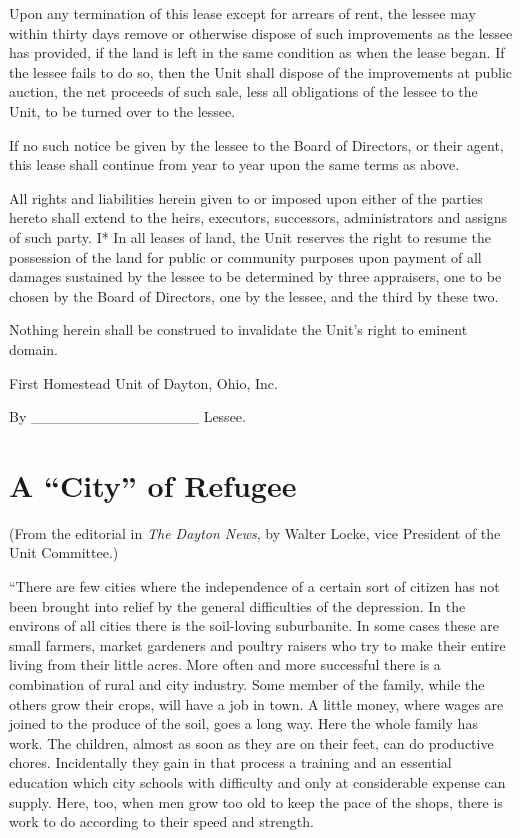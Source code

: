 \documentclass{book}
\begin{document}
Upon any termination of this lease except for arrears of rent, the lessee may within thirty days remove or otherwise dispose of such improvements as the lessee has provided, if the land is left in the same condition as when the lease began. If the lessee fails to do so, then the Unit shall dispose of the improvements at public auction, the net proceeds of such sale, less all obligations of the lessee to the Unit, to be turned over to the lessee.

If no such notice be given by the lessee to the Board of Directors, or their agent, this lease shall continue from year to year upon the same terms as above.

All rights and liabilities herein given to or imposed upon either of the parties hereto shall extend to the heirs, executors, successors, administrators and assigns of such party. I* In all leases of land, the Unit reserves the right to resume the possession of the land for public or community purposes upon payment of all damages sustained by the lessee to be determined by three appraisers, one to be chosen by the Board of Directors, one by the lessee, and the third by these two.

Nothing herein shall be construed to invalidate the Unit’s right to eminent domain.

First Homestead Unit of Dayton, Ohio, Inc.

By \_\_\_\_\_\_\_\_\_\_\_\_\_\_\_\_ Lessee.

\section*{A “City” of Refugee}
 (From the editorial in \emph{The Dayton News}, by Walter Locke, vice President of the Unit Committee.)

“There are few cities where the independence of a certain sort of citizen has not been brought into relief by the general difficulties of the depression. In the environs of all cities there is the soil-loving suburbanite. In some cases these are small farmers, market gardeners and poultry raisers who try to make their entire living from their little acres. More often and more successful there is a combination of rural and city industry. Some member of the family, while the others grow their crops, will have a job in town. A little money, where wages are joined to the produce of the soil, goes a long way. Here the whole family has work. The children, almost as soon as they are on their feet, can do productive chores. Incidentally they gain in that process a training and an essential education which city schools with difficulty and only at considerable expense can supply. Here, too, when men grow too old to keep the pace of the shops, there is work to do according to their speed and strength.
\end{document}
